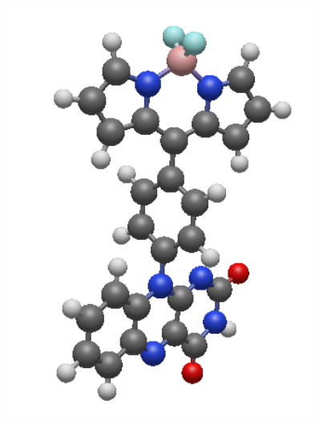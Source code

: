 \begin{figure}
\centering
\begin{minipage}{0.45\textwidth}
\centering
\includegraphics[width=0.9\textwidth]{Pics/FLVA.png}
\end{minipage}
\begin{minipage}{0.45\textwidth}
\centering

\end{minipage}
\end{figure}
